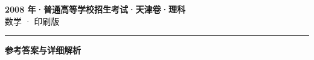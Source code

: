 \documentclass[zihao=5, a4paper]{ctexart}
\begin{document}
\begin{center}
  {\Large\bfseries 2008 年·普通高等学校招生考试·天津卷·理科}\\[4pt]
  {\large 数学 · 印刷版}
\end{center}
\medskip
{}

\par\bigskip\hrule\bigskip
{}
\begin{center}{\large\bfseries 参考答案与详细解析}\end{center}
\smallskip

\end{document}
